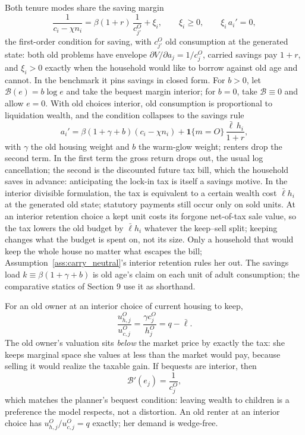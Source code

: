 \documentclass[11pt]{article}
\newcommand{\1}{\mathbf 1}
\begin{document}
Both tenure modes share the saving margin
\begin{equation}
\frac{1}{c_i-\chi n_i}
=
\beta(1+r)\,
\frac{1}{c_{j'}^O}
+\xi_i,
\qquad
\xi_i\ge0,
\qquad
\xi_i\,a_i'=0,
\label{eq:compact_euler}
\end{equation}
the first-order condition for saving, with $c_{j'}^O$ old consumption at the generated state: both old problems have envelope $\partial V/\partial a_j=1/c_j^O$, carried savings pay $1+r$, and $\xi_i>0$ exactly when the household would like to borrow against old age and cannot. In the benchmark it pins savings in closed form. For $b>0$, let $\mathcal B(e)=b\log e$ and take the bequest margin interior; for $b=0$, take $\mathcal B\equiv0$ and allow $e=0$. With old choices interior, old consumption is proportional to liquidation wealth, and the condition collapses to the savings rule
\begin{equation}
a_i'=\beta\left(1+\gamma+b\right)(c_i-\chi n_i)+\1\{m=O\}\,\frac{\bar\ell\,h_i}{1+r},
\label{eq:compact_savings_rule}
\end{equation}
with $\gamma$ the old housing weight and $b$ the warm-glow weight; renters drop the second term. In the first term the gross return drops out, the usual log cancellation; the second is the discounted future tax bill, which the household saves in advance: anticipating the lock-in tax is itself a savings motive. In the interior divisible formulation, the tax is equivalent to a certain wealth cost $\bar\ell h_i$ at the generated old state; statutory payments still occur only on sold units. At an interior retention choice a kept unit costs its forgone net-of-tax sale value, so the tax lowers the old budget by $\bar\ell h_i$ whatever the keep--sell split; keeping changes what the budget is spent on, not its size. Only a household that would keep the whole house no matter what escapes the bill; Assumption~\ref{ass:carry_neutral}'s interior retention rules her out. The savings load $k\equiv\beta(1+\gamma+b)$ is old age's claim on each unit of adult consumption; the comparative statics of Section 9 use it as shorthand.

For an old owner at an interior choice of current housing to keep,
\begin{equation}
\frac{u^O_{h,j}}{u^O_{c,j}}
=
\frac{\gamma c_j^O}{h_j^O}
=
q-\bar\ell.
\label{eq:compact_old_mv}
\end{equation}
The old owner's valuation sits \emph{below} the market price by exactly the tax: she keeps marginal space she values at less than the market would pay, because selling it would realize the taxable gain. If bequests are interior, then
\[
\mathcal B'(e_j)=\frac{1}{c_j^O},
\]
which matches the planner's bequest condition: leaving wealth to children is a preference the model respects, not a distortion. An old renter at an interior choice has $u^O_{h,j}/u^O_{c,j}=q$ exactly; her demand is wedge-free.
\end{document}
